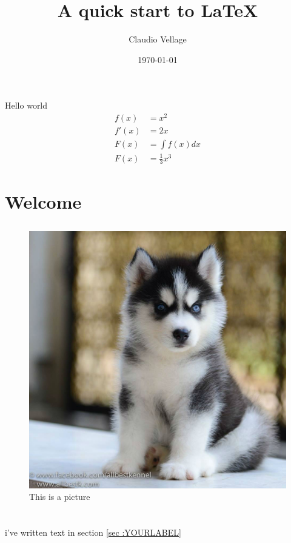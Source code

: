 \documentclass {article}
\begin{document}
Hello world
\begin{align}
f(x) &= x^2\\
f'(x) &= 2x\\
F(x) &= \int f(x)dx\\
F(x) &= \frac{1}{3}x^3
\end{align}


\section{Welcome} %
\subsection{}
\subsubsection{}
\paragraph{}%
\subparagraph{}

\author{Claudio Vellage} %
\title{A quick start to \LaTeX{}} %
\date{\today{}} %
\maketitle{} %
\tableofcontents{} %


\begin{figure}
\includegraphics[width=\textwidth]{figure/dog.jpg}
\caption{This is a picture}
\end{figure}
\section{}\label{sec:YOURLABEL}
i've written text in section \ref{sec :YOURLABEL}
\end{document}
